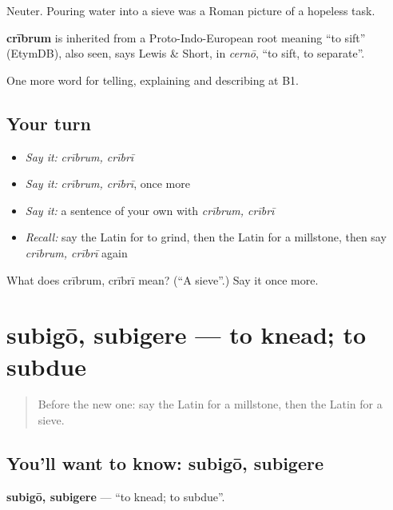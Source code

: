 Neuter. Pouring water into a sieve was a Roman picture of a hopeless task.

\begin{cousinweb}
\textbf{crībrum} is inherited from a Proto-Indo-European root meaning \textquotedblleft{}to sift\textquotedblright{} (EtymDB), also seen, says Lewis \& Short, in \emph{cernō}, \textquotedblleft{}to sift, to separate\textquotedblright{}.
\end{cousinweb}

\begin{grammarlens}[title={What you've built}]
One more word for telling, explaining and describing at B1.
\end{grammarlens}

\subsection*{Your turn}
\begin{itemize}
\raggedright
  \item \emph{Say it:} \emph{crībrum, crībrī}
  \item \emph{Say it:} \emph{crībrum, crībrī}, once more
  \item \emph{Say it:} a sentence of your own with \emph{crībrum, crībrī}
  \item \emph{Recall:} say the Latin for to grind, then the Latin for a millstone, then say \emph{crībrum, crībrī} again
\end{itemize}

\begin{tcolorbox}[breakable,colback=teal!4,colframe=teal!35!black,title={Before you move on}]
What does crībrum, crībrī mean? (\textquotedblleft{}A sieve\textquotedblright{}.) Say it once more.
\end{tcolorbox}
\section[subigō, subigere]{subigō, subigere — to knead; to subdue}

\label{lesson:LA-C352-subigo}



\begin{quote}
Before the new one: say the Latin for a millstone, then the Latin for a sieve.
\end{quote}

\subsection*{You'll want to know: subigō, subigere}
\textbf{subigō, subigere} — \textquotedblleft{}to knead; to subdue\textquotedblright{}.

